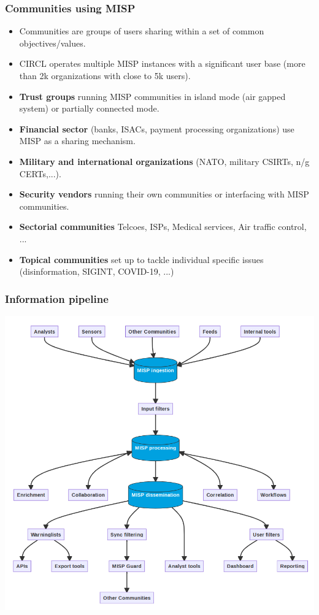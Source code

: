 \begin{frame}
 \frametitle{Communities using MISP}
 \begin{itemize}
	 \item Communities are groups of users sharing within a set of common objectives/values.
	 \item CIRCL operates multiple MISP instances with a significant user base (more than 2k organizations with close to 5k users).
         \item {\bf Trust groups} running MISP communities in island mode (air gapped system) or partially connected mode.
	 \item {\bf Financial sector} (banks, ISACs, payment processing organizations) use MISP as a sharing mechanism.
	 \item {\bf Military and international organizations} (NATO, military CSIRTs, n/g CERTs,...).
	 \item {\bf Security vendors} running their own communities or interfacing with MISP communities.
	 \item {\bf Sectorial communities} Telcoes, ISPs, Medical services, Air traffic control, ...
         \item {\bf Topical communities} set up to tackle individual specific issues (disinformation, SIGINT, COVID-19, ...)
 \end{itemize}
\end{frame}


\begin{frame}
\frametitle{Information pipeline}
    \includegraphics[width=0.75\linewidth]{misp_data_flow.png}
\end{frame}


